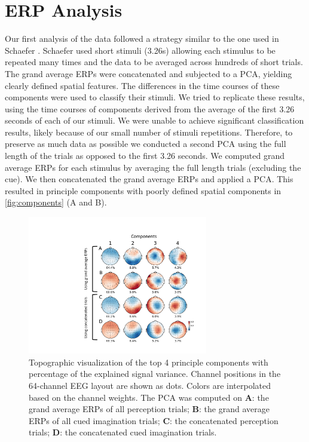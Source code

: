 \chapter{ERP Analysis}

Our first analysis of the data followed a strategy similar to the one used in Schaefer \etal \citeyear{schaefer_name_2011}.
Schaefer \etal \citeyear{schaefer_name_2011} used short stimuli (3.26s) allowing each stimulus to be repeated many times and the data to be averaged across hundreds of short trials. 
The grand average \acp{ERP} were concatenated and subjected to a \ac{PCA}, yielding clearly defined spatial features. 
The differences in the time courses of these components were used to classify their stimuli. 
We tried to replicate these results, using the time courses of components derived from the average of the first 3.26 seconds of each of our stimuli. 
We were unable to achieve significant classification results, likely because of our small number of stimuli repetitions.
Therefore, to preserve as much data as possible we conducted a second \ac{PCA} using the full length of the trials as opposed to the first 3.26 seconds. 
We computed grand average \acp{ERP} for each stimulus by averaging the full length trials (excluding the cue).
We then concatenated the grand average \acp{ERP} and applied a \ac{PCA}. 
This resulted in principle components with poorly defined spatial components in \autoref{fig:components} (A and B).
\begin{figure}[htb]	%
  \centerline{\includegraphics[width=0.7\textwidth]{Figures/principal_components_labels.pdf}}
  \caption{Topographic visualization of the top 4 principle components with percentage of the explained signal variance. Channel positions in the 64-channel EEG layout are shown as dots. Colors are interpolated based on the channel weights. The PCA was computed on {\bf A}: the grand average \acp{ERP} of all perception trials; {\bf B}: the grand average \acp{ERP} of all cued imagination trials; {\bf C}: the concatenated perception trials; {\bf D}: the concatenated cued imagination trials.}
  \label{fig:components}
\end{figure}

